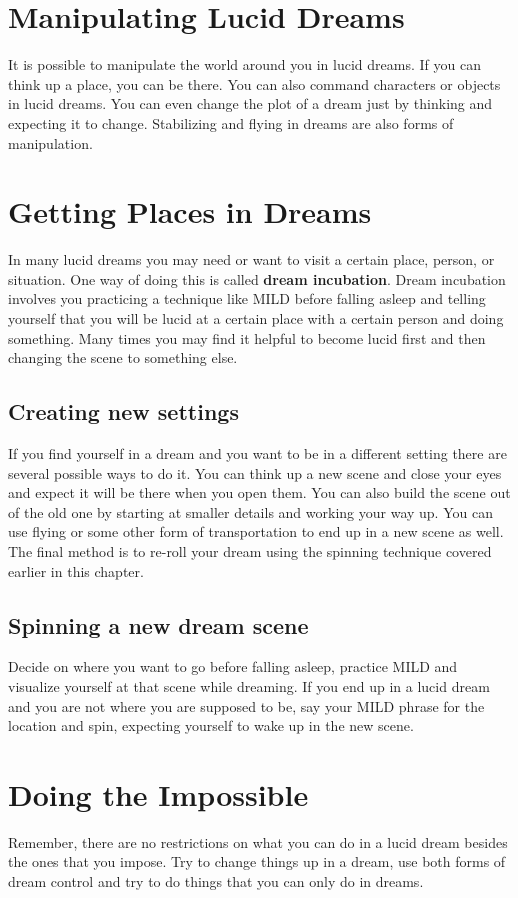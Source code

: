 \documentclass{report}
\begin{document}
\section{Manipulating Lucid Dreams}
It is possible to manipulate the world around you in lucid dreams. If you can think up a place, you can be there. You can also command characters or objects in lucid dreams. You can even change the plot of a dream just by thinking and expecting it to change. Stabilizing and flying in dreams are also forms of manipulation.

\section{Getting Places in Dreams}
In many lucid dreams you may need or want to visit a certain place, person, or situation. One way of doing this is called \textbf{dream incubation}. Dream incubation involves you practicing a technique like MILD before falling asleep and telling yourself that you will be lucid at a certain place with a certain person and doing something. Many times you may find it helpful to become lucid first and then changing the scene to something else.

\subsection{Creating new settings}
If you find yourself in a dream and you want to be in a different setting there are several possible ways to do it. You can think up a new scene and close your eyes and expect it will be there when you open them. You can also build the scene out of the old one by starting at smaller details and working your way up. You can use flying or some other form of transportation to end up in a new scene as well. The final method is to re-roll your dream using the spinning technique covered earlier in this chapter.

\subsection{Spinning a new dream scene}
Decide on where you want to go before falling asleep, practice MILD and visualize yourself at that scene while dreaming. If you end up in a lucid dream and you are not where you are supposed to be, say your MILD phrase for the location and spin, expecting yourself to wake up in the new scene.

\section{Doing the Impossible}
Remember, there are no restrictions on what you can do in a lucid dream besides the ones that you impose. Try to change things up in a dream, use both forms of dream control and try to do things that you can only do in dreams.
\end{document}
